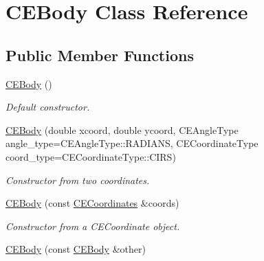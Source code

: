 \hypertarget{class_c_e_body}{}\section{C\+E\+Body Class Reference}
\label{class_c_e_body}
\subsection*{Public Member Functions}
\begin{DoxyCompactItemize}
\item 
\hypertarget{class_c_e_body_abd36081ccb5770d61e2da22e3f50d552}{}\hyperlink{class_c_e_body_abd36081ccb5770d61e2da22e3f50d552}{C\+E\+Body} ()\label{class_c_e_body_abd36081ccb5770d61e2da22e3f50d552}

\begin{DoxyCompactList}\small\item\em Default constructor. \end{DoxyCompactList}\item 
\hypertarget{class_c_e_body_ab0b96cb0cd4b2f04ba8969dc2b88fb82}{}\hyperlink{class_c_e_body_ab0b96cb0cd4b2f04ba8969dc2b88fb82}{C\+E\+Body} (double xcoord, double ycoord, C\+E\+Angle\+Type angle\+\_\+type=C\+E\+Angle\+Type\+::\+R\+A\+D\+I\+A\+N\+S, C\+E\+Coordinate\+Type coord\+\_\+type=C\+E\+Coordinate\+Type\+::\+C\+I\+R\+S)\label{class_c_e_body_ab0b96cb0cd4b2f04ba8969dc2b88fb82}

\begin{DoxyCompactList}\small\item\em Constructor from two coordinates. \end{DoxyCompactList}\item 
\hypertarget{class_c_e_body_ae37bba2077f7f3a1ed933e8ad6dd24bf}{}\hyperlink{class_c_e_body_ae37bba2077f7f3a1ed933e8ad6dd24bf}{C\+E\+Body} (const \hyperlink{class_c_e_coordinates}{C\+E\+Coordinates} \&coords)\label{class_c_e_body_ae37bba2077f7f3a1ed933e8ad6dd24bf}

\begin{DoxyCompactList}\small\item\em Constructor from a C\+E\+Coordinate object. \end{DoxyCompactList}\item 
\hypertarget{class_c_e_body_ac8bcbe8f5c0fd548e5473de324add4a9}{}\hyperlink{class_c_e_body_ac8bcbe8f5c0fd548e5473de324add4a9}{C\+E\+Body} (const \hyperlink{class_c_e_body}{C\+E\+Body} \&other)\label{class_c_e_body_ac8bcbe8f5c0fd548e5473de324add4a9}


\end{DoxyCompactItemize}
